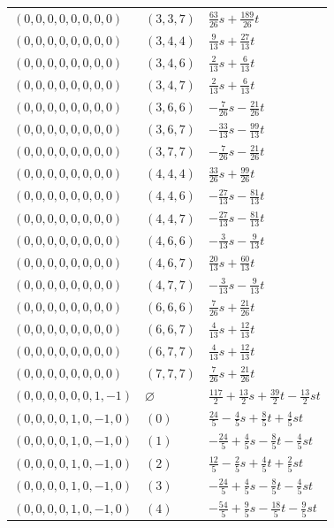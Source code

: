 \begin{longtable}{@{}lll@{}}
$(0,0,0,0,0,0,0,0)$ & $(3,3,7)$ & $\frac{63}{26}s+\frac{189}{26}t$\\
$(0,0,0,0,0,0,0,0)$ & $(3,4,4)$ & $\frac{9}{13}s+\frac{27}{13}t$\\
$(0,0,0,0,0,0,0,0)$ & $(3,4,6)$ & $\frac{2}{13}s+\frac{6}{13}t$\\
$(0,0,0,0,0,0,0,0)$ & $(3,4,7)$ & $\frac{2}{13}s+\frac{6}{13}t$\\
$(0,0,0,0,0,0,0,0)$ & $(3,6,6)$ & $-\frac{7}{26}s-\frac{21}{26}t$\\
$(0,0,0,0,0,0,0,0)$ & $(3,6,7)$ & $-\frac{33}{13}s-\frac{99}{13}t$\\
$(0,0,0,0,0,0,0,0)$ & $(3,7,7)$ & $-\frac{7}{26}s-\frac{21}{26}t$\\
$(0,0,0,0,0,0,0,0)$ & $(4,4,4)$ & $\frac{33}{26}s+\frac{99}{26}t$\\
$(0,0,0,0,0,0,0,0)$ & $(4,4,6)$ & $-\frac{27}{13}s-\frac{81}{13}t$\\
$(0,0,0,0,0,0,0,0)$ & $(4,4,7)$ & $-\frac{27}{13}s-\frac{81}{13}t$\\
$(0,0,0,0,0,0,0,0)$ & $(4,6,6)$ & $-\frac{3}{13}s-\frac{9}{13}t$\\
$(0,0,0,0,0,0,0,0)$ & $(4,6,7)$ & $\frac{20}{13}s+\frac{60}{13}t$\\
$(0,0,0,0,0,0,0,0)$ & $(4,7,7)$ & $-\frac{3}{13}s-\frac{9}{13}t$\\
$(0,0,0,0,0,0,0,0)$ & $(6,6,6)$ & $\frac{7}{26}s+\frac{21}{26}t$\\
$(0,0,0,0,0,0,0,0)$ & $(6,6,7)$ & $\frac{4}{13}s+\frac{12}{13}t$\\
$(0,0,0,0,0,0,0,0)$ & $(6,7,7)$ & $\frac{4}{13}s+\frac{12}{13}t$\\
$(0,0,0,0,0,0,0,0)$ & $(7,7,7)$ & $\frac{7}{26}s+\frac{21}{26}t$\\
$(0,0,0,0,0,0,1,-1)$ & $\varnothing$ & $\frac{117}{2}+\frac{13}{2}s+\frac{39}{2}t-\frac{13}{2}st$\\
$(0,0,0,0,1,0,-1,0)$ & $(0)$ & $\frac{24}{5}-\frac{4}{5}s+\frac{8}{5}t+\frac{4}{5}st$\\
$(0,0,0,0,1,0,-1,0)$ & $(1)$ & $-\frac{24}{5}+\frac{4}{5}s-\frac{8}{5}t-\frac{4}{5}st$\\
$(0,0,0,0,1,0,-1,0)$ & $(2)$ & $\frac{12}{5}-\frac{2}{5}s+\frac{4}{5}t+\frac{2}{5}st$\\
$(0,0,0,0,1,0,-1,0)$ & $(3)$ & $-\frac{24}{5}+\frac{4}{5}s-\frac{8}{5}t-\frac{4}{5}st$\\
$(0,0,0,0,1,0,-1,0)$ & $(4)$ & $-\frac{54}{5}+\frac{9}{5}s-\frac{18}{5}t-\frac{9}{5}st$\\

\end{longtable}

